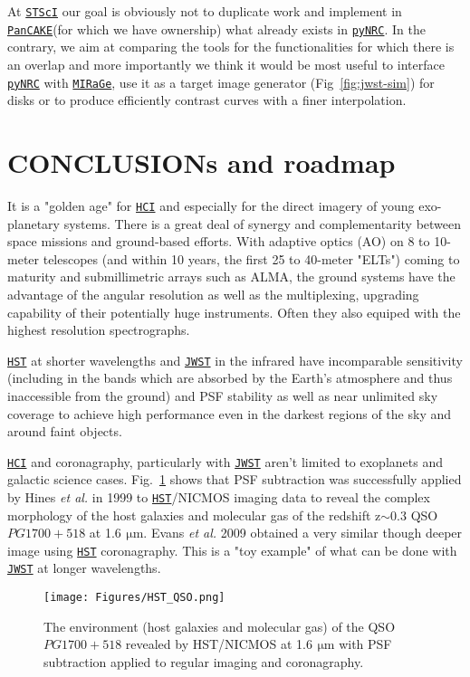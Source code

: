 \documentclass[]{spie}  %
\newcommand{\micron}{$\SI{}{\, \micro\meter}$\xspace}
\newcommand{\stsci}{{\tt \href{https://www.stsci.edu}{STScI}}\xspace}
\newcommand{\jwst}{{\tt \href{https://jwst.stsci.edu}{JWST}}\xspace}
\newcommand{\hst}{{\tt \href{https://hst.stsci.edu}{HST}}\xspace}
\newcommand{\pynrc}{{\tt \href{https://pynrc.readthedocs.io/en/latest/}{pyNRC}}\xspace}
\newcommand{\pancake}{{\tt \href{https://github.com/spacetelescope/pandeia-coronagraphy}{PanCAKE}}\xspace}
\newcommand{\hci}{{\tt \href{https://jwst-docs.stsci.edu/display/JPP/JWST+High-Contrast+Imaging?q=High}{HCI}}\xspace}%
\newcommand{\mirage}{{\tt \href{https://github.com/spacetelescope/mirage}{MIRaGe}}\xspace}%
\begin{document}
At \stsci our goal is obviously not to duplicate work and implement in \pancake (for which we have ownership) what already exists in \pynrc. In the contrary, we aim at comparing the tools for the functionalities for which there is an overlap and more importantly we think it would be most useful to interface \pynrc with \mirage, use it as a target image generator (Fig~\ref{fig:jwst-sim}) for disks or to produce efficiently contrast curves with a finer interpolation.

\section{CONCLUSIONs and roadmap}

It is a "golden age" for \hci and especially for the direct imagery of young exo-planetary systems. There is a great deal of synergy and complementarity between space missions and ground-based efforts. With adaptive optics (AO) on 8 to 10-meter telescopes (and within 10 years, the first 25 to 40-meter "ELTs") coming to maturity and submillimetric arrays such as ALMA, the ground systems have the advantage of the angular resolution as well as the multiplexing, upgrading capability of their potentially huge instruments. Often they also equiped with the highest resolution spectrographs.

\hst at shorter wavelengths and \jwst in the infrared have incomparable sensitivity (including in the bands which are absorbed by the Earth's atmosphere and thus inaccessible from the ground) and PSF stability as well as near unlimited sky coverage to achieve high performance even in the darkest regions of the sky and around faint objects.

\hci and coronagraphy, particularly with \jwst aren't limited to exoplanets and galactic science cases. Fig.~\ref{fig:qso} shows that PSF subtraction was successfully applied by Hines {\em et al.} in 1999\cite{hines1999_qso} to \hst/NICMOS imaging data to reveal the complex morphology of the host galaxies and molecular gas of the redshift z$\sim$0.3 QSO $PG 1700+518$ at 1.6\micron. Evans {\em et al.} 2009\cite{evans2009_qso} obtained a very similar though deeper image using \hst coronagraphy. This is a "toy example" of what can be done with \jwst at longer wavelengths.

\begin{figure}[h!]
\begin{center}
\texttt{[image: Figures/HST\_QSO.png]}
\caption{The environment (host galaxies and molecular gas) of the QSO $PG 1700+518$ revealed by HST/NICMOS at 1.6\micron with PSF subtraction applied to regular imaging and coronagraphy.}
\label{fig:qso}
\end{center}
\end{figure}
\end{document}
